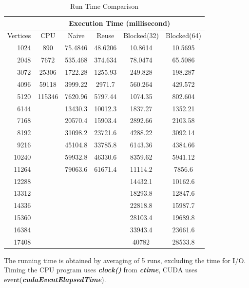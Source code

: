 \documentclass[12pt,a4paper]{article}
\newcommand{\func}[1]{{\bfseries \slshape \nobreakdash #1}}
\begin{document}
\begin{table}[h]
\centering
\begin{tabular}[c]{| r || c | c | c | c | c |}
  \hline
    & \multicolumn{5}{|c|}{Execution Time (millisecond)} \\
  \hline
  Vertices & CPU & Naive & Reuse & Blocked(32) & Blocked(64)\footnotemark[1] \\
  \hline
  \hline
  1024 & 890 & 75.4846 & 48.6206 & 10.8614 & 10.5695 \\
  \hline
  2048 & 7672 & 535.468 & 374.634 & 78.0474 & 65.5086 \\
  \hline
  3072 & 25306 & 1722.28 & 1255.93 & 249.828 & 198.287 \\
  \hline
  4096 & 59118 & 3999.22 & 2971.7 & 560.264 & 429.572 \\
  \hline
  5120 & 115346 & 7620.96 & 5797.44 & 1074.35 & 802.604 \\
  \hline
  6144 &  & 13430.3 & 10012.3 & 1837.27 & 1352.21 \\
  \hline
  7168 &  & 20570.4 & 15903.4 & 2892.66 & 2103.58 \\
  \hline
  8192 &  & 31098.2 & 23721.6 & 4288.22 & 3092.14 \\
  \hline
  9216 &  & 45104.8 & 33785.8 & 6143.36 & 4384.66 \\
  \hline
  10240 &  & 59932.8 & 46330.6 & 8359.62 & 5941.12 \\
  \hline
  11264 &  & 79063.6 & 61671.4 & 11114.2 & 7856.6 \\
  \hline
  12288 &  &  &  & 14432.1 & 10162.6 \\
  \hline
  13312 &  &  &  & 18293.8 & 12847.6 \\
  \hline
  14336 &  &  &  & 22818.8 & 15987.7 \\
  \hline
  15360 &  &  &  & 28103.4 & 19689.8 \\
  \hline
  16384 &  &  &  & 33943.4 & 23661.6 \\
  \hline
  17408 &  &  &  & 40782 & 28533.8 \\
  \hline
  
\end{tabular}
\caption{Run Time Comparison}
\end{table}
The running time is obtained by averaging of 5 runs, excluding the time for I/O. Timing the CPU program uses \func{clock()} from \func{ctime}, CUDA uses event(\func{cudaEventElapsedTime}).
\end{document}
